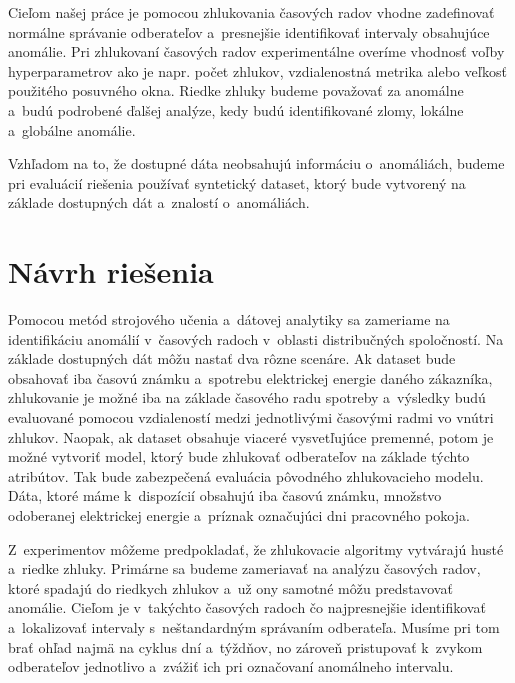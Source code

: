 \documentclass[a4paper,twoside,slovak,12pt,appendix]{article}
\begin{document}
Cieľom našej práce je pomocou zhlukovania časových radov vhodne zadefinovať
normálne správanie odberateľov a~presnejšie identifikovať intervaly obsahujúce
anomálie. Pri zhlukovaní časových radov experimentálne overíme vhodnosť voľby
hyperparametrov ako je napr. počet zhlukov, vzdialenostná metrika alebo veľkosť
použitého posuvného okna. Riedke zhluky budeme považovať za anomálne a~budú
podrobené ďalšej analýze, kedy budú identifikované zlomy, lokálne a~globálne
anomálie.

Vzhľadom na to, že dostupné dáta neobsahujú informáciu o~anomáliách, budeme pri
evaluácií riešenia používať syntetický dataset, ktorý bude vytvorený na základe
dostupných dát a~znalostí o~anomáliách.

\newpage\null\thispagestyle{empty}\newpage


\newpage
\section{Návrh riešenia}
\label{c:solution-design}
Pomocou metód strojového učenia a~dátovej analytiky sa zameriame na
identifikáciu anomálií v~časových radoch v~oblasti distribučných spoločností. Na
základe dostupných dát môžu nastať dva rôzne scenáre. Ak dataset bude obsahovať
iba časovú známku a~spotrebu elektrickej energie daného zákazníka, zhlukovanie
je možné iba na základe časového radu spotreby a~výsledky budú evaluované
pomocou vzdialeností medzi jednotlivými časovými radmi vo vnútri zhlukov.
Naopak, ak dataset obsahuje viaceré vysvetľujúce premenné, potom je možné
vytvoriť model, ktorý bude zhlukovať odberateľov na základe týchto atribútov.
Tak bude zabezpečená evaluácia pôvodného zhlukovacieho modelu. Dáta, ktoré máme
k~dispozícií obsahujú iba časovú známku, množstvo odoberanej elektrickej energie
a~príznak označujúci dni pracovného pokoja.

Z~experimentov môžeme predpokladať, že zhlukovacie algoritmy vytvárajú husté
a~riedke zhluky. Primárne sa budeme zameriavať na analýzu časových radov,
ktoré spadajú do riedkych zhlukov a~už ony samotné môžu predstavovať anomálie.
Cieľom je v~takýchto časových radoch čo najpresnejšie identifikovať
a~lokalizovať intervaly s~neštandardným správaním odberateľa. Musíme pri tom
brať ohľad najmä na cyklus dní a~týždňov, no zároveň pristupovať k~zvykom
odberateľov jednotlivo a~zvážiť ich pri označovaní anomálneho intervalu.
\end{document}
